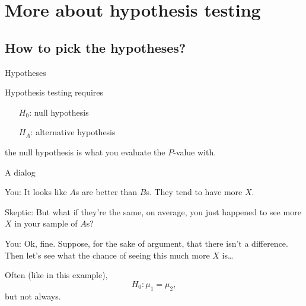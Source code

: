 \section{More about hypothesis testing}

\subsection{How to pick the hypotheses?}

\begin{frame}{Hypotheses}

    Hypothesis testing requires 
    \begin{itemize}
        \item[$H_0$:] null hypothesis
        \item[$H_A$:] alternative hypothesis
    \end{itemize}

    \vspace{2em}

     the null hypothesis is what you evaluate the $P$-value with.


\end{frame}


\begin{frame}{A dialog}
    \begin{itemizew}{1em}
        \item[You:] It looks like $A$s are better than $B$s.  They tend to have more $X$.
        \item[Skeptic:] But what if they're the same, on average, you just happened to see more $X$ in your sample of $A$s?
        \item[You:] Ok, fine.  Suppose, for the sake of argument, that there \alert{isn't} a difference.
            Then let's see what the chance of seeing this much more $X$ is\ldots
    \end{itemizew}

    \vspace{2em}

    Often (like in this example), 
        \[ H_0: \mu_1 = \mu_2 , \]
    but not always.

\end{frame}


